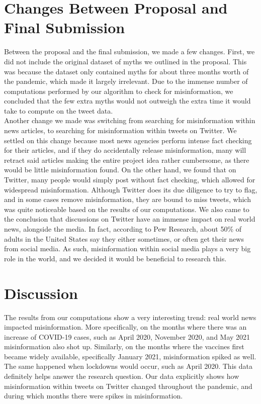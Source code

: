 \documentclass[fontsize=11pt]{article}
\begin{document}
    \section*{Changes Between Proposal and Final Submission}
    Between the proposal and the final submission, we made a few changes. First, we did not include the original dataset of myths we outlined in the proposal. This was because the dataset only contained myths for about three months worth of the pandemic, which made it largely irrelevant. Due to the immense number of computations performed by our algorithm to check for misinformation, we concluded that the few extra myths would not outweigh the extra time it would take to compute on the tweet data. \\
    Another change we made was switching from searching for misinformation within news articles, to searching for misinformation within tweets on Twitter. We settled on this change because most news agencies perform intense fact checking for their articles, and if they do accidentally release misinformation, many will retract said articles making the entire project idea rather cumbersome, as there would be little misinformation found. On the other hand, we found that on Twitter, many people would simply post without fact checking, which allowed for widespread misinformation. Although Twitter does its due diligence to try to flag, and in some cases remove misinformation, they are bound to miss tweets, which was quite noticeable based on the results of our computations. We also came to the conclusion that discussions on Twitter have an immense impact on real world news, alongside the media. In fact, according to Pew Research, about 50\% of adults in the United States say they either sometimes, or often get their news from social media. As such, misinformation within social media plays a very big role in the world, and we decided it would be beneficial to research this.

    \section*{Discussion}
    The results from our computations show a very interesting trend: real world news impacted misinformation. More specifically, on the months where there was an increase of COVID-19 cases, such as April 2020, November 2020, and May 2021 misinformation also shot up. Similarly, on the months where the vaccines first became widely available, specifically January 2021, misinformation spiked as well. The same happened when lockdowns would occur, such as April 2020. This data definitely helps answer the research question. Our data explicitly shows how misinformation within tweets on Twitter changed throughout the pandemic, and during which months there were spikes in misinformation.
\end{document}
